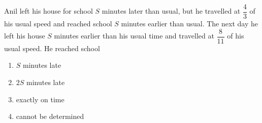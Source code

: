 Anil left his house for school $S$ minutes later than usual, but he travelled at $\dfrac{4}{3}$ of his usual speed and reached school $S$ minutes earlier than usual. The next day he left his house $S$ minutes earlier than his usual time and travelled at $\dfrac{8}{11}$ of his usual speed. He reached school
\begin{enumerate}
\item[(a)] $S$ minutes late
\item[(b)] $2S$ minutes late
\item[(c)] exactly on time
\item[(d)] cannot be determined
\end{enumerate}
